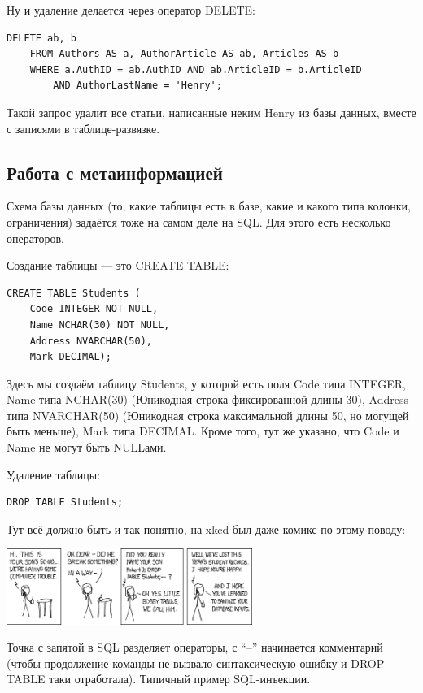 \documentclass[a5paper]{article}
\begin{document}
Ну и удаление делается через оператор DELETE:

\begin{verbatim}
DELETE ab, b
    FROM Authors AS a, AuthorArticle AS ab, Articles AS b
    WHERE a.AuthID = ab.AuthID AND ab.ArticleID = b.ArticleID
        AND AuthorLastName = 'Henry';
\end{verbatim}

Такой запрос удалит все статьи, написанные неким Henry из базы данных, вместе с записями в таблице-развязке.

\subsection{Работа с метаинформацией}

Схема базы данных (то, какие таблицы есть в базе, какие и какого типа колонки, ограничения) задаётся тоже на самом деле на SQL. Для этого есть несколько операторов.

Создание таблицы --- это CREATE TABLE:

\begin{verbatim}
CREATE TABLE Students (
    Code INTEGER NOT NULL,
    Name NCHAR(30) NOT NULL,
    Address NVARCHAR(50),
    Mark DECIMAL);
\end{verbatim}

Здесь мы создаём таблицу Students, у которой есть поля Code типа INTEGER, Name типа NCHAR(30) (Юникодная строка фиксированной длины 30), Address типа NVARCHAR(50) (Юникодная строка максимальной длины 50, но могущей быть меньше), Mark типа DECIMAL. Кроме того, тут же указано, что Code и Name не могут быть NULLами.

Удаление таблицы:

\begin{verbatim}
DROP TABLE Students;
\end{verbatim}

Тут всё должно быть и так понятно, на xkcd был даже комикс по этому поводу:

\begin{center}
	\includegraphics[width=0.6\textwidth]{bobbyTables.png}
\end{center}

Точка с запятой в SQL разделяет операторы, с ``--'' начинается комментарий (чтобы продолжение команды не вызвало синтаксическую ошибку и DROP TABLE таки отработала). Типичный пример SQL-инъекции.
\end{document}
